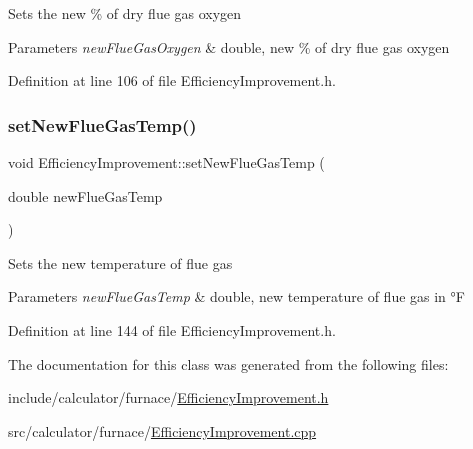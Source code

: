Sets the new \% of dry flue gas oxygen


\begin{DoxyParams}{Parameters}
{\em new\+Flue\+Gas\+Oxygen} & double, new \% of dry flue gas oxygen \\
\hline
\end{DoxyParams}


Definition at line 106 of file Efficiency\+Improvement.\+h.

\mbox{\label{class_efficiency_improvement_ab88d3976fca8f55bb1fd3278bc427fc1}} 
\subsubsection{\texorpdfstring{set\+New\+Flue\+Gas\+Temp()}{setNewFlueGasTemp()}}
{\footnotesize\ttfamily void Efficiency\+Improvement\+::set\+New\+Flue\+Gas\+Temp (\begin{DoxyParamCaption}\item[{double}]{new\+Flue\+Gas\+Temp }\end{DoxyParamCaption})\hspace{0.3cm}{\ttfamily [inline]}}

Sets the new temperature of flue gas


\begin{DoxyParams}{Parameters}
{\em new\+Flue\+Gas\+Temp} & double, new temperature of flue gas in °F \\
\hline
\end{DoxyParams}


Definition at line 144 of file Efficiency\+Improvement.\+h.



The documentation for this class was generated from the following files\+:\begin{DoxyCompactItemize}
\item 
include/calculator/furnace/\hyperlink{_efficiency_improvement_8h}{Efficiency\+Improvement.\+h}\item 
src/calculator/furnace/\hyperlink{_efficiency_improvement_8cpp}{Efficiency\+Improvement.\+cpp}\end{DoxyCompactItemize}
